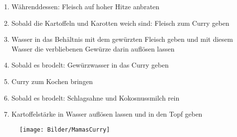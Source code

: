 \begin{enumerate}[noitemsep]
	\item Währenddessen: Fleisch auf hoher Hitze anbraten 
	\item Sobald die Kartoffeln und Karotten weich sind: Fleisch zum Curry geben
	\item Wasser in das Behältnis mit dem gewürzten Fleisch geben und mit diesem Wasser die verbliebenen Gewürze darin auflösen lassen
	\item Sobald es brodelt: Gewürzwasser in das Curry geben
	\item Curry zum Kochen bringen
	\item Sobald es brodelt: Schlagsahne und Kokosnussmilch rein
	\item Kartoffelstärke in Wasser auflösen lassen und in den Topf geben
\end{enumerate}
\begin{figure}[h]
\centering
\texttt{[image: Bilder/MamasCurry]}
\end{figure}